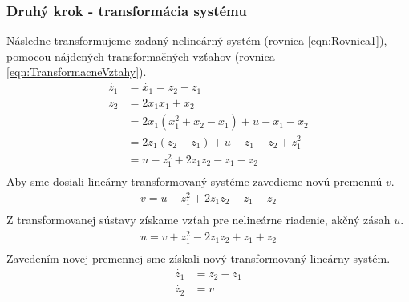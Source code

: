 \documentclass[../main.tex]{subfiles}
\begin{document}
\subsubsection{Druhý krok - transformácia systému}
Následne transformujeme zadaný nelineárný systém (rovnica \ref{eqn:Rovnica1}), pomocou nájdených transformačných vzťahov (rovnica \ref{eqn:TransformacneVztahy}).
\begin{equation}
	\begin{aligned}
	\dot{z_1} &= \dot{x_1} = z_2 - z_1 \\
	\dot{z_2} &= 2x_1\dot{x_1} + \dot{x_2} \\
	          & = 2x_1(x_1^2 + x_2 - x_1) + u - x_1 - x_2 \\
	          & = 2z_1(z_2 - z_1) + u - z_1 - z_2 + z_1^2\\
	          & = u - z_1^2 + 2z_1z_2 - z_1 - z_2 \\
	\end{aligned}
	\label{eqn:TransformovanySystem}
\end{equation}
Aby sme dosiali lineárny transformovaný systéme zavedieme novú premennú $v$.
\begin{equation}
	\begin{split}
	 v = u - z_1^2 + 2z_1z_2 - z_1 - z_2 \\
	\end{split}
	\label{eqn:SubsV}
\end{equation}
Z transformovanej sústavy získame vzťah pre nelineárne riadenie, akčný zásah $u$.
\begin{equation}
	\begin{gathered}
		u = v + z_1^2 - 2z_1z_2 + z_1 + z_2\\
	\end{gathered}
	\label{eqn:Noveu}
\end{equation}
Zavedením novej premennej sme získali nový transformovaný lineárny systém.
\begin{equation}
	\begin{aligned}
	\dot{z_1}  &= z_2 - z_1 \\
	 \dot{z_2} &= v \\
	\end{aligned}
	\label{eqn:TransformovanySystem}
\end{equation}
\end{document}
